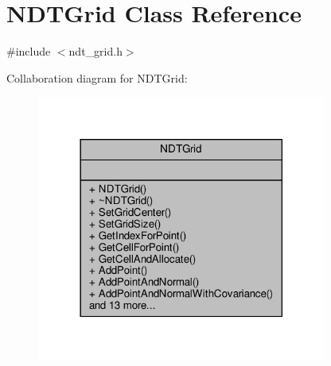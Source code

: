 \hypertarget{classNDTGrid}{}\section{N\+D\+T\+Grid Class Reference}
\label{classNDTGrid}


{\ttfamily \#include $<$ndt\+\_\+grid.\+h$>$}



Collaboration diagram for N\+D\+T\+Grid\+:\nopagebreak
\begin{figure}[H]
\begin{center}
\leavevmode
\includegraphics[width=270pt]{dc/dab/classNDTGrid__coll__graph}
\end{center}
\end{figure}
